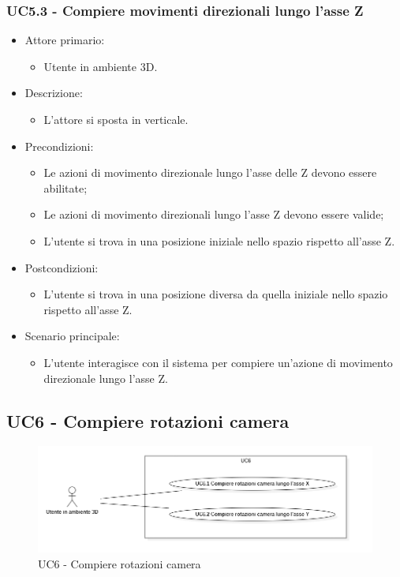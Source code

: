 \subsubsection{UC5.3 - Compiere movimenti direzionali lungo l'asse Z}
\begin{itemize}

	\item Attore primario: 
	\begin{itemize}
		\item Utente in ambiente 3D.
	\end{itemize}
	\item Descrizione:
	\begin{itemize}
		\item  L'attore si sposta in verticale.
	\end{itemize}
	
	\item Precondizioni:
	\begin{itemize}
		\item Le azioni di movimento direzionale lungo l'asse delle Z devono essere abilitate;
		\item Le azioni di movimento direzionali lungo l'asse Z devono essere valide;
		\item L'utente si trova in una posizione iniziale nello spazio rispetto all'asse Z.
	\end{itemize}
	
	\item Postcondizioni:
	\begin{itemize}
		\item L'utente si trova in una posizione diversa da quella iniziale nello spazio rispetto all'asse Z.
	\end{itemize}
	
	\item Scenario principale:
	\begin{itemize}
		\item L'utente interagisce con il sistema per compiere un'azione di movimento direzionale lungo l'asse Z.
	\end{itemize}
	
\end{itemize}

\pagebreak

\subsection{UC6 - Compiere rotazioni camera}

\begin{figure}[H]
  \renewcommand{\thefigure}{7}
  \includegraphics[width=\linewidth]{./res/images/UC6.png}
  \caption{UC6 - Compiere rotazioni camera}
  \label{fig:UC 6}
\end{figure}

